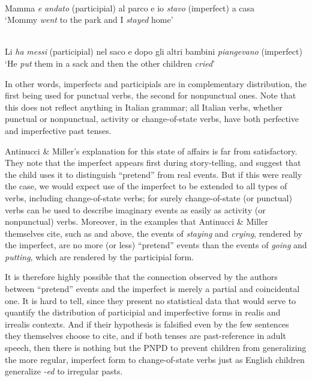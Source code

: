 \ea\label{ex:3:22}
\\
  Mamma \textit{e} \textit{andato} (participial) al parco e io \textit{stavo} (imperfect) a casa\\
\glt `Mommy \textit{went} to the park and I \textit{stayed} home'
\z

\ea\label{ex:3:23}
\\
  Li \textit{ha} \textit{messi} (participial) nel saco e dopo gli altri bambini \textit{piangevano} (imperfect)\\ 
\glt `He \textit{put} them in a sack and then the other children \textit{cried}'
\z

\noindent In other words, imperfects and participials are in complementary distribution, the first being used for punctual verbs, the second for nonpunctual ones. Note that this does not reflect anything in Italian grammar; all Italian verbs, whether punctual or nonpunctual, activity or change-of-state verbs, have both perfective and imperfective past tenses.

Antinucci \& Miller's explanation for this state of affairs is far from satisfactory. They note that the imperfect appears first during story-telling, and suggest that the child uses it to distinguish ``pretend'' from real events. But if this were really the case, we would expect use of the imperfect to be extended to all types of verbs, including change-of-state verbs; for surely change-of-state (or punctual) verbs can be used to describe imaginary events as easily as activity (or nonpunctual) verbs. Moreover, in the examples that Antinucci \& Miller themselves cite, such as  and  above, the events of \textit{staying} and \textit{crying}, rendered by the imperfect, are no more (or less) ``pretend'' events than the events of \textit{going} and \textit{putting}, which are rendered by the participial form.


It is therefore highly possible that the connection observed by the authors between ``pretend'' events and the imperfect is merely a partial and coincidental one. It is hard to tell, since they present no statistical data that would serve to quantify the distribution of participial and imperfective forms in realis and irrealis contexts. And if their hypothesis is falsified even by the few sentences they themselves choose to cite, and if both tenses are past-reference in adult speech, then there is nothing but the PNPD to prevent children from generalizing the more regular, imperfect form to change-of-state verbs just as English children generalize \textit{-ed} to irregular pasts.

